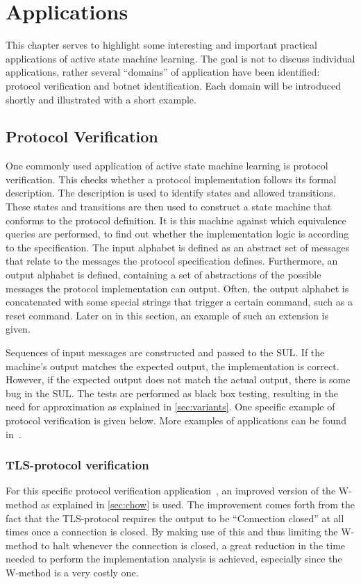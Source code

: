 \documentclass[multi,crop=false,class=article]{standalone}
\begin{document}
\section{Applications}
\label{sec:applications}

This chapter serves to highlight some interesting and important practical
applications of active state machine learning. The goal is not to discuss
individual applications, rather several ``domains'' of application have been
identified: protocol verification and  botnet identification.
Each domain will be introduced shortly and illustrated with a short example.

\subsection{Protocol Verification}
One commonly used application of active state machine learning is
protocol verification. This checks whether a protocol implementation follows
its formal description. The description is used to identify states and
allowed transitions. These states and transitions are then used to construct a
state machine that conforms to the protocol definition. It is this machine
against which equivalence queries are performed, to find out whether the
implementation logic is according to the specification. The input alphabet
is defined as an abstract set of messages that relate to the messages the
protocol specification defines. Furthermore, an output alphabet is defined,
containing a set of abstractions of the possible messages the protocol
implementation can output. Often, the output alphabet is concatenated with
some special strings that trigger a certain command, such as a reset command.
Later on in this section, an example of such an extension is given.

Sequences of input messages are constructed and passed to the SUL. If the
machine's output matches the expected output, the implementation is correct.
However, if the expected output does not match the actual output, there is
some bug in the SUL. The tests are performed as black box testing, resulting
in the need for approximation as explained in \cref{sec:variants}. One specific
example of protocol verification is given below. More examples of applications
can be found in~\cite{Aarts2013,Cho2010,Aarts2010}.

\subsubsection{TLS-protocol verification} For this specific protocol verification
application~\cite{deRuiter2015}, an improved version of the W-method as explained
in \cref{sec:chow} is used. The improvement comes forth from the fact that the
TLS-protocol requires the output to be ``Connection closed'' at all times once a
connection is closed. By making use of this and thus limiting the W-method to
halt whenever the connection is closed, a great reduction in the time needed to
perform the implementation analysis is achieved, especially since the W-method is
a very costly one.
\end{document}
